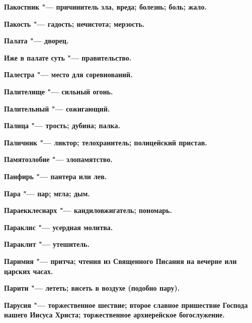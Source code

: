 \begin{mymulticols}{2}
\bfseries Пакостник\normalfont{} "--- причинитель зла, вреда; болезнь; боль; жало. 




\bfseries Пакость\normalfont{} "--- гадость; нечистота; мерзость. 




\bfseries Палата\normalfont{} "--- дворец. 




\bfseries Иже в палате суть\normalfont{} "--- правительство. 




\bfseries Палестра\normalfont{} "--- место для соревнований. 




\bfseries Палителище\normalfont{} "--- сильный огонь. 




\bfseries Палительный\normalfont{} "--- сожигающий. 




\bfseries Палица\normalfont{} "--- трость; дубина; палка. 




\bfseries Паличник\normalfont{} "--- ликтор; телохранитель; полицейский пристав. 




\bfseries Памятозлобие\normalfont{} "--- злопамятство. 




\bfseries Панфирь\normalfont{} "--- пантера или лев. 




\bfseries Пара\normalfont{} "--- пар; мгла; дым. 




\bfseries Параекклесиарх\normalfont{} "--- кандиловжигатель; пономарь. 




\bfseries Параклис\normalfont{} "--- усердная молитва. 




\bfseries Параклит\normalfont{} "--- утешитель. 




\bfseries Паримия\normalfont{} "--- притча; чтения из Священного Писания на вечерне или царских часах. 




\bfseries Парити\normalfont{} "--- лететь; висеть в воздухе (подобно пару). 




\bfseries Парусия\normalfont{} "--- торжественное шествие; второе славное пришествие Господа нашего Иисуса Христа; торжественное архиерейское богослужение. 





\end{mymulticols}
